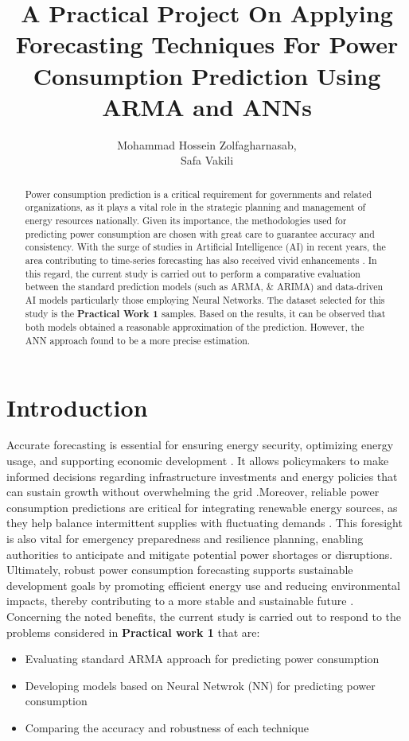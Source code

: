 \documentclass{article}
\title{A Practical Project On Applying Forecasting Techniques For Power Consumption Prediction Using ARMA and ANNs}
\author{Mohammad Hossein Zolfagharnasab, \\
Safa Vakili}
\begin{document}
\maketitle

\begin{abstract}
Power consumption prediction is a critical requirement for governments and related organizations, as it plays a vital role in the strategic planning and management of energy resources nationally. Given its importance, the methodologies used for predicting power consumption are chosen with great care to guarantee accuracy and consistency. With the surge of studies in Artificial Intelligence (AI) in recent years, the area contributing to time-series forecasting has also received vivid enhancements \cite{ebrahimpour2011mixture}. In this regard, the current study is carried out to perform a comparative evaluation between the standard prediction models (such as ARMA, \& ARIMA) and  data-driven AI models particularly those employing Neural Networks. The dataset selected for this study is the \textbf{Practical Work 1} samples.\@
Based on the results, it can be observed that both models obtained a reasonable approximation of the prediction. However, the ANN approach found to be a more precise estimation.
\end{abstract}

\section{Introduction}
Accurate forecasting is essential for ensuring energy security, optimizing energy usage, and supporting economic development \cite{landsiedel2005accurate}. It allows policymakers to make informed decisions regarding infrastructure investments and energy policies that can sustain growth without overwhelming the grid \cite{salam2018comparison}.\@ Moreover, reliable power consumption predictions are critical for integrating renewable energy sources, as they help balance intermittent supplies with fluctuating demands \cite{ullah2019short}. This foresight is also vital for emergency preparedness and resilience planning, enabling authorities to anticipate and mitigate potential power shortages or disruptions. Ultimately, robust power consumption forecasting supports sustainable development goals by promoting efficient energy use and reducing environmental impacts, thereby contributing to a more stable and sustainable future \cite{ahn2022prediction}. Concerning the noted benefits, the current study is carried out to respond to the problems considered in \textbf{Practical work 1} that are:
\begin{itemize}
    \item Evaluating standard ARMA approach for predicting power consumption
    \item Developing models based on Neural Netwrok (NN) for predicting power consumption
    \item Comparing the accuracy and robustness of each technique
\end{itemize}
\end{document}
